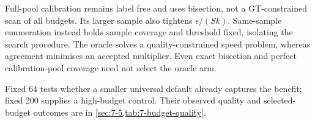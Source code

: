 Full-pool calibration remains label free and uses bisection, not a
GT-constrained scan of all budgets. Its larger sample also tightens
$\epsilon/(Sk)$. Same-sample enumeration instead holds sample coverage
and threshold fixed, isolating the search procedure. The oracle solves a
quality-constrained speed problem, whereas agreement minimises an accepted
multiplier. Even exact bisection and perfect calibration-pool coverage
need not select the oracle arm.

Fixed 64 tests whether a smaller universal default already captures the
benefit; fixed 200 supplies a high-budget control. Their observed quality
and selected-budget outcomes are in
\cref{sec:7-5,tab:7-budget-quality}.
